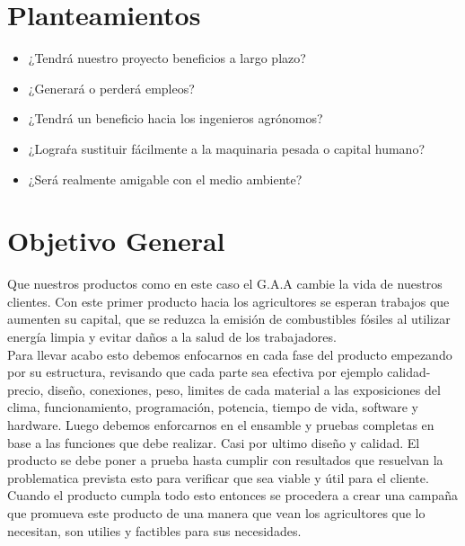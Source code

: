 \documentclass[11pt,a4paper]{article}
\begin{document}
\newpage
\section{Planteamientos}

\begin{itemize}

\item ¿Tendrá nuestro proyecto beneficios a largo plazo?\\
\item ¿Generará o perderá empleos?\\
\item ¿Tendrá un beneficio hacia los ingenieros agrónomos?\\
\item ¿Lograŕa sustituir fácilmente a la maquinaria pesada o capital humano?\\
\item ¿Será realmente amigable con el medio ambiente?\\
\end{itemize} 

\section{Objetivo General}

Que nuestros productos como en este caso el G.A.A cambie la vida de nuestros clientes. Con este primer producto hacia los agricultores se esperan trabajos que aumenten su capital, que se reduzca la emisión de combustibles fósiles al utilizar energía limpia y evitar daños a la salud de los trabajadores.\\

Para llevar acabo esto debemos enfocarnos en cada fase del producto empezando por su estructura, revisando que cada parte sea efectiva por ejemplo calidad-precio, diseño, conexiones, peso, limites de cada material a las exposiciones del clima, funcionamiento, programación, potencia, tiempo de vida, software y hardware. Luego debemos enforcarnos en el ensamble y pruebas completas en base a las funciones que debe realizar. Casi por ultimo diseño y calidad. El producto se debe poner a prueba hasta cumplir con resultados que resuelvan la problematica prevista esto para verificar que sea viable y útil para el cliente. Cuando el producto cumpla todo esto entonces se procedera a crear una campaña que promueva este producto de una manera que vean los agricultores que lo necesitan, son utilies y factibles para sus necesidades.\\
\end{document}
